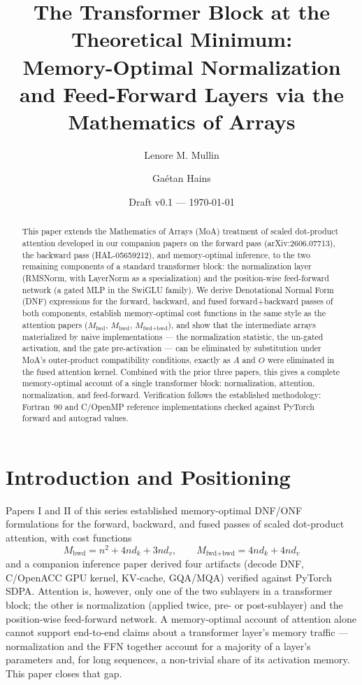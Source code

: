 \documentclass[11pt]{article}
\title{The Transformer Block at the Theoretical Minimum:\\
Memory-Optimal Normalization and Feed-Forward Layers via the\\
Mathematics of Arrays}
\author{Lenore M. Mullin \and Ga\'etan Hains}
\date{Draft v0.1 --- \today}
\theoremstyle{definition}
\begin{document}
\maketitle

\begin{abstract}
This paper extends the Mathematics of Arrays (MoA) treatment of scaled
dot-product attention developed in our companion papers on the forward
pass (arXiv:2606.07713), the backward pass (HAL-05659212), and
memory-optimal inference, to the two remaining components of a standard
transformer block: the normalization layer (RMSNorm, with LayerNorm as a
specialization) and the position-wise feed-forward network (a gated MLP
in the SwiGLU family). We derive Denotational Normal Form (DNF)
expressions for the forward, backward, and fused forward+backward passes
of both components, establish memory-optimal cost functions in the same
style as the attention papers ($M_{\text{fwd}}$, $M_{\text{bwd}}$,
$M_{\text{fwd+bwd}}$), and show that the intermediate arrays materialized
by naive implementations --- the normalization statistic, the
un-gated activation, and the gate pre-activation --- can be eliminated
by substitution under MoA's outer-product compatibility conditions,
exactly as $A$ and $O$ were eliminated in the fused attention kernel.
Combined with the prior three papers, this gives a complete
memory-optimal account of a single transformer block: normalization,
attention, normalization, and feed-forward. Verification follows the
established methodology: Fortran~90 and C/OpenMP reference
implementations checked against PyTorch forward and autograd values.
\end{abstract}

\section{Introduction and Positioning}

Papers I and II of this series established memory-optimal DNF/ONF
formulations for the forward, backward, and fused passes of scaled
dot-product attention, with cost functions
\[
M_{\text{bwd}} = n^2 + 4nd_k + 3nd_v, \qquad
M_{\text{fwd+bwd}} = 4nd_k + 4nd_v
\]
and a companion inference paper derived four artifacts (decode DNF,
C/OpenACC GPU kernel, KV-cache, GQA/MQA) verified against PyTorch SDPA.
Attention is, however, only one of the two sublayers in a transformer
block; the other is normalization (applied twice, pre- or post-sublayer)
and the position-wise feed-forward network. A memory-optimal account of
attention alone cannot support end-to-end claims about a transformer
layer's memory traffic --- normalization and the FFN together account
for a majority of a layer's parameters and, for long sequences, a
non-trivial share of its activation memory. This paper closes that gap.
\end{document}
